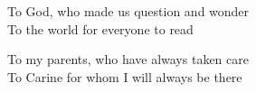\newpage
\section*{}
\vspace{6cm}
To God, who made us question and wonder \\

\noindent
To the world for everyone to read \\

\noindent
To my parents, who have always taken care \\

\noindent
To Carine for whom I will always be there
\vfill
